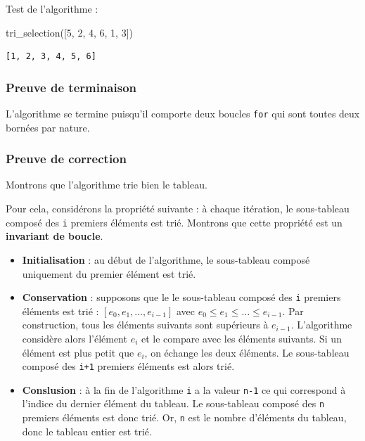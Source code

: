 \documentclass[
  a4paper,
  DIV=11,
  numbers=noendperiod]{scrartcl}
\newenvironment{Shaded}{\begin{snugshade}}{\end{snugshade}}
\newcommand{\DecValTok}[1]{\textcolor[rgb]{0.68,0.00,0.00}{#1}}
\newcommand{\NormalTok}[1]{\textcolor[rgb]{0.00,0.23,0.31}{#1}}
\providecommand{\tightlist}{%
  \setlength{\itemsep}{0pt}\setlength{\parskip}{0pt}}\usepackage{longtable,booktabs,array}
\begin{document}
Test de l'algorithme :

\begin{Shaded}
\begin{Highlighting}[]
\NormalTok{tri\_selection([}\DecValTok{5}\NormalTok{, }\DecValTok{2}\NormalTok{, }\DecValTok{4}\NormalTok{, }\DecValTok{6}\NormalTok{, }\DecValTok{1}\NormalTok{, }\DecValTok{3}\NormalTok{])}
\end{Highlighting}
\end{Shaded}

\begin{verbatim}
[1, 2, 3, 4, 5, 6]
\end{verbatim}

\hypertarget{preuve-de-terminaison-1}{%
\subsubsection{Preuve de terminaison}\label{preuve-de-terminaison-1}}

L'algorithme se termine puisqu'il comporte deux boucles \texttt{for} qui
sont toutes deux bornées par nature.

\hypertarget{preuve-de-correction-1}{%
\subsubsection{Preuve de correction}\label{preuve-de-correction-1}}

Montrons que l'algorithme trie bien le tableau.

Pour cela, considérons la propriété suivante : à chaque itération, le
sous-tableau composé des \texttt{i} premiers éléments est trié. Montrons
que cette propriété est un \textbf{invariant de boucle}.

\begin{itemize}
\tightlist
\item
  \textbf{Initialisation} : au début de l'algorithme, le sous-tableau
  composé uniquement du premier élément est trié.
\item
  \textbf{Conservation} : supposons que le le sous-tableau composé des
  \texttt{i} premiers éléments est trié :
  \([e_0, e_1, \ldots, e_{i-1}]\) avec
  \(e_0\leqslant e_1\leqslant \ldots \leqslant e_{i-1}\). Par
  construction, tous les éléments suivants sont supérieurs à
  \(e_{i-1}\). L'algorithme considère alors l'élément \(e_i\) et le
  compare avec les éléments suivants. Si un élément est plus petit que
  \(e_i\), on échange les deux éléments. Le sous-tableau composé des
  \texttt{i+1} premiers éléments est alors trié.
\item
  \textbf{Conslusion} : à la fin de l'algorithme \texttt{i} a la valeur
  \texttt{n-1} ce qui correspond à l'indice du dernier élément du
  tableau. Le sous-tableau composé des \texttt{n} premiers éléments est
  donc trié. Or, \texttt{n} est le nombre d'éléments du tableau, donc le
  tableau entier est trié.
\end{itemize}
\end{document}
